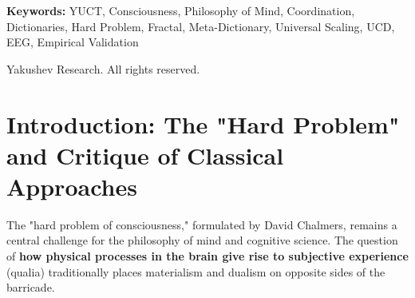 \documentclass[12pt,a4paper]{article}
\DeclareRobustCommand{\alD}{\texorpdfstring{\ensuremath{\alpha_{\mathrm{D}}}}{alpha_D}}
\DeclareRobustCommand{\beI}{\texorpdfstring{\ensuremath{\beta_{\mathrm{I}}}}{beta_I}}
\DeclareRobustCommand{\gaR}{\texorpdfstring{\ensuremath{\gamma_{\mathrm{R}}}}{gamma_R}}
\newcommand{\eff}{\mathrm{eff}}
\newcommand{\Ke}{K_{\eff}}
\begin{document}
\begin{titlepage}
\begin{center}
\begin{abstract}
				Crucially, this philosophical framework is now grounded in the universal empirical law \(\varepsilon = \kappa_c \alpha \Ke^{-\beta}\) with \(\beta = 0.67\), verified across more than 50 orders of magnitude (Appendix L) and independently confirmed in six scientific domains: physics (gravitational waves, GWTC-4.0), astrophysics (white dwarfs, 26,041 objects), geophysics (Earth–Moon system), chemistry (873 bond energies), biology (68 vertebrate genomes), and neuroscience (EEG correlates of consciousness, UCD parameters). In particular, the Universal Consciousness Descriptor (UCD) introduced in Appendix H provides quantitative measures \(\alD, \beI, \gaR\) that correlate with conscious states and follow the same scaling law. 
				
				Philosophical implications include: (1) naturalization of consciousness without reductionism; (2) a new understanding of the evolution of mind as growth in the complexity of coordination dictionaries; (3) the possibility of non-anthropomorphic forms of consciousness (artificial, collective, planetary); (4) connection with dark matter/energy as limits of cosmological coordination. YUCT offers not only a solution to the "hard problem" but a unified philosophical platform for dialogue between neuroscience, physics, and the humanities, now empirically validated.
			\end{abstract}
			
			\vspace{0cm}
			
			\noindent
			\small\textbf{Keywords:} YUCT, Consciousness, Philosophy of Mind, Coordination, Dictionaries, Hard Problem, Fractal, Meta-Dictionary, Universal Scaling, UCD, EEG, Empirical Validation
			
			\vspace{0.5cm}
			
			\noindent
			 Yakushev Research. All rights reserved.
		\end{center}
	\end{titlepage}
	
	\tableofcontents
	
	\newpage
	
	\section{Introduction: The "Hard Problem" and Critique of Classical Approaches}
	
	The "hard problem of consciousness," formulated by David Chalmers, remains a central challenge for the philosophy of mind and cognitive science. The question of \textbf{how physical processes in the brain give rise to subjective experience} (qualia) traditionally places materialism and dualism on opposite sides of the barricade.
	
\end{document}
